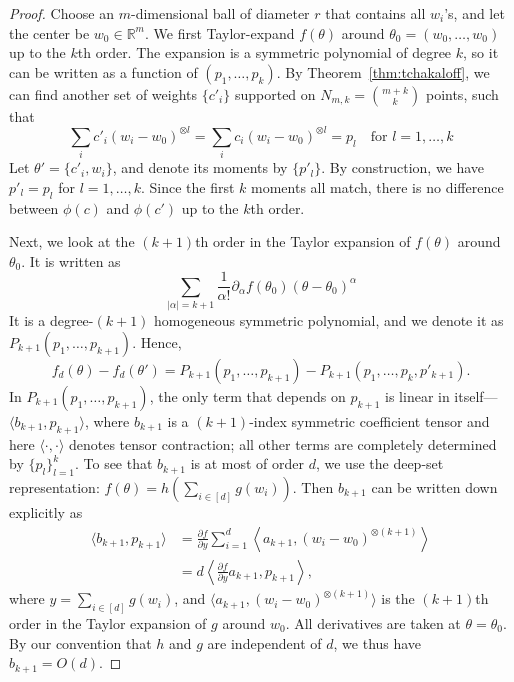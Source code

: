 \documentclass{article}
\theoremstyle{plain}
\begin{document}
\begin{proof}
    Choose an $m$-dimensional ball of diameter $r$ that contains all $w_i$'s, and let the center be $w_0\in \mathbb{R}^m$. We first Taylor-expand $f(\theta)$ around $\theta_0=(w_0,\dots, w_0)$ up to the $k$th order. The expansion is a symmetric polynomial of degree $k$, so it can be written as a function of $(p_1, \dots, p_k)$. By Theorem~\ref{thm:tchakaloff}, we can find another set of weights $\{c'_i\}$ supported on $N_{m,k} = \binom{m+k}{k}$ points, such that
    \begin{equation}
        \sum_i c'_i (w_i-w_0)^{\otimes l} 
        = \sum_i c_i (w_i-w_0)^{\otimes l}
        = p_l \quad \textrm{for }l=1,\dots, k
    \end{equation}
    Let $\theta'=\{c'_i, w_i\}$, and denote its moments by $\{p'_l\}$. By construction, we have $p'_l=p_l$ for $l=1,\dots, k$. Since the first $k$ moments all match, there is no difference between $\phi(c)$ and $\phi(c')$ up to the $k$th order. 

    Next, we look at the $(k+1)$th order in the Taylor expansion of $f(\theta)$ around $\theta_0$. It is written as
    \begin{equation}
        \sum_{|\alpha|=k+1} \frac{1}{\alpha!} \partial_\alpha f(\theta_0) (\theta-\theta_0)^\alpha
    \end{equation}
    It is a degree-$(k+1)$ homogeneous symmetric polynomial, and we denote it as $P_{k+1} (p_1, \dots, p_{k+1})$. Hence, 
    \begin{equation}
        f_d(\theta) - f_d(\theta') = P_{k+1} (p_1, \dots, p_{k+1}) - P_{k+1} (p_1, \dots, p_k, p'_{k+1})    .
    \end{equation}
    In $P_{k+1} (p_1, \dots, p_{k+1})$, the only term that depends on $p_{k+1}$ is linear in itself---$\langle b_{k+1},  p_{k+1}\rangle$, where $b_{k+1}$ is a $(k+1)$-index symmetric coefficient tensor and here $\langle \cdot, \cdot\rangle$ denotes tensor contraction; all other terms are completely determined by $\{p_l\}_{l=1}^k$. To see that $b_{k+1}$ is at most of order $d$, we use the deep-set representation: $f(\theta) = h ( \sum_{i\in[d]} g(w_i) )$. Then $b_{k+1}$ can be written down explicitly as
    \begin{equation}
        \begin{aligned}
            \langle b_{k+1},  p_{k+1}\rangle 
            &= \frac{\partial f}{\partial y} \sum_{i=1}^d \left\langle a_{k+1}, (w_i-w_0)^{\otimes (k+1)} \right\rangle    \\
            &= d \left\langle \frac{\partial f}{\partial y} a_{k+1} , p_{k+1} \right\rangle
            ,
        \end{aligned}
    \end{equation}
    where $y=\sum_{i\in[d]} g(w_i)$, and $\langle a_{k+1}, (w_i-w_0)^{\otimes (k+1)} \rangle$ is the $(k+1)$th order in the Taylor expansion of $g$ around $w_0$. All derivatives are taken at $\theta=\theta_0$. By our convention that $h$ and $g$ are independent of $d$, we thus have $b_{k+1} = O(d)$. 
    

\end{proof}
\end{document}
